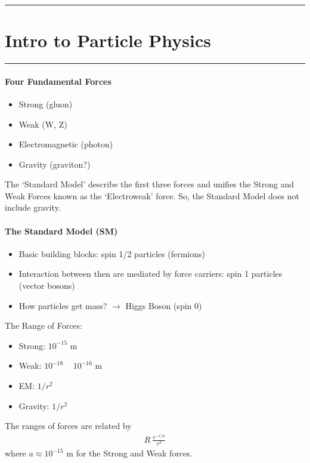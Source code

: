 \documentclass[../main.tex]{subfiles}
\begin{document}
\hrule
\section{Intro to Particle Physics}
\hrule \vspace{10px}

\paragraph{Four Fundamental Forces}

\begin{itemize}
    \item Strong (gluon)
    \item Weak (W, Z)
    \item Electromagnetic (photon)
    \item Gravity (graviton?)
\end{itemize}

The `Standard Model' describe the first three forces and unifies the Strong and Weak Forces known as
the `Electroweak' force. So, the Standard Model does not include gravity.

\paragraph{The Standard Model (SM)}
\begin{itemize}
    \item Basic building blocks: spin 1/2 particles (fermions)

    \item Interaction between then are mediated by force carriers:
    spin 1 particles (vector bosons)
    
    \item How particles get mass? $\rightarrow$ Higgs Boson (spin 0)
\end{itemize}

The Range of Forces:
\begin{itemize}
    \item Strong: $10^{-15}$ m
    \item Weak: $10^{-18}$ ~ $10^{-16}$ m
    \item EM: $1/r^2$
    \item Gravity: $1/r^2$
\end{itemize}

The ranges of forces are related by
\begin{align*}
    R ~ \frac{e^{-r/a}}{r^2}
\end{align*}
where $a \approx 10^{-15}$ m for the Strong and Weak forces.
\end{document}
